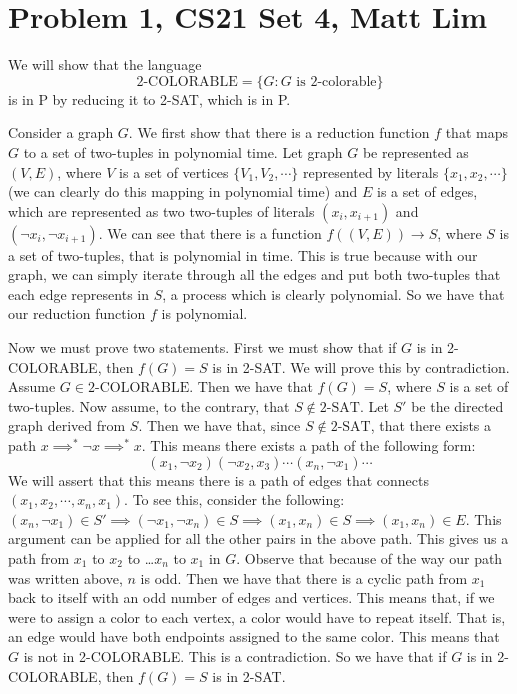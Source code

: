 \documentclass{article}
\begin{document}



\section*{Problem 1, CS21 Set 4, Matt Lim}
We will show that the language
\[ \text{2-COLORABLE} = \{G : G \text{ is 2-colorable}\} \]
is in P by reducing it to 2-SAT, which is in P.

Consider a graph $G$. We first show that there is a reduction function $f$
that maps $G$ to a set of two-tuples in polynomial time. Let graph $G$ be
represented as $(V,E)$, where $V$ is a set of vertices $\{V_{1}, V_{2}, \cdots\}$
represented by literals $\{x_{1}, x_{2}, \cdots\}$ (we can clearly do
this mapping in polynomial time) and $E$ is a set of
edges, which are represented as two two-tuples of literals $(x_{i}, x_{i + 1})$
and $(\neg x_{i}, \neg x_{i + 1})$.
We can see that there is a function $f((V,E)) \rightarrow S$, where $S$
is a set of two-tuples, that is polynomial in time. This is true because
with our graph, we can simply iterate through all the edges and put both
two-tuples that each edge represents in $S$, a process which is clearly
polynomial. So we have that our reduction
function $f$ is polynomial.

Now we must prove two statements. First we must show that if $G$ is in
2-COLORABLE, then $f(G) = S$ is in 2-SAT. We will prove this by contradiction.
Assume $G \in \text{2-COLORABLE}$. Then we have that $f(G) = S$, where $S$ is a set
of two-tuples. Now assume, to the contrary, that $S \notin \text{2-SAT}$. Let
$S'$ be the directed graph derived from $S$. Then we have that, since
$S \notin \text{2-SAT}$, that there exists a path
$x \implies^{*} \neg x \implies^{*} x$. This means there exists a path of the
following form: \[ (x_{1} , \neg x_{2})(\neg x_{2} , x_{3})\cdots
(x_{n} , \neg x_{1})\cdots\]
We will assert that this means there is a path of edges that connects
$(x_{1}, x_{2}, \cdots, x_{n}, x_{1})$. To see this, consider the following:
$(x_{n}, \neg x_{1}) \in S' \implies (\neg x_{1} , \neg x_{n}) \in S
\implies (x_{1}, x_{n}) \in S \implies (x_{1}, x_{n}) \in E$. This argument
can be applied for all the other pairs in the above path. This gives us
a path from $x_{1}$ to $x_{2}$ to \ldots $x_{n}$ to $x_{1}$ in $G$. Observe that
because of the way our path was written above, $n$ is odd. Then we have that
there is a cyclic path from $x_{1}$ back to itself with an odd number of
edges and vertices. This means that, if we were to assign a color to each
vertex, a color would have to repeat itself. That is, an edge would have
both endpoints assigned to the same color. This means that $G$ is not in
2-COLORABLE. This is a contradiction. So we have that if $G$ is in
2-COLORABLE, then $f(G) = S$ is in 2-SAT.
\end{document}
